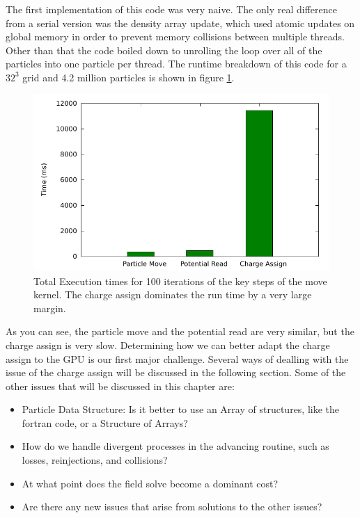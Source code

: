 The first implementation of this code was very naive. The only real difference from a serial version was the density array update, which used atomic updates on global memory in order to prevent memory collisions between multiple threads. Other than that the code boiled down to unrolling the loop over all of the particles into one particle per thread. The runtime breakdown of this code for a $32^3$ grid and 4.2 million particles is shown in figure \ref{fig:GPUPIC_basetime}.


\begin{figure}
\begin{center}
\includegraphics[width=5in]{design/sandbox_run_histo.pdf}
\end{center}
\caption[Sandbox GPUPIC Code Profile]{Total Execution times for 100 iterations of the key steps of the move kernel. The charge assign dominates the run time by a very large margin.}
\label{fig:GPUPIC_basetime} 
\end{figure}



As you can see, the particle move and the potential read are very similar, but the charge assign is very slow. Determining how we can better adapt the charge assign to the GPU is our first major challenge. Several ways of dealling with the issue of the charge assign will be discussed in the following section. Some of the other issues that will be discussed in this chapter are:

\begin{itemize}\itemsep0pt \parskip0pt 
\item Particle Data Structure: Is it better to use an Array of structures, like the fortran code, or a Structure of Arrays?
\item How do we handle divergent processes in the advancing routine, such as losses, reinjections, and collisions?
\item At what point does the field solve become a dominant cost?
\item Are there any new issues that arise from solutions to the other issues?
\end{itemize}


